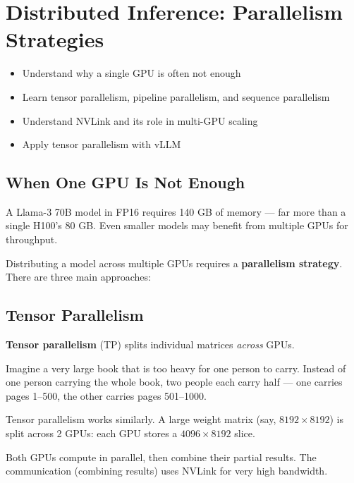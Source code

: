 \documentclass[10pt, oneside, openany]{book}
\newcommand{\analogybox}[2]{\begin{tcolorbox}[analogystyle, title={Analogy: #1}]#2\end{tcolorbox}}
\newenvironment{learningobjectives}
  {\begin{tcolorbox}[enhanced, breakable,
    colback={rgb,255:red,232;green,240;blue,255},
    colframe=NavyBlue, boxrule=1.5pt, arc=4pt,
    title={\bfseries Learning Objectives},
    fonttitle=\bfseries\color{white},
    attach boxed title to top left={yshift=-2mm, xshift=5mm},
    boxed title style={colback=NavyBlue, arc=2pt}]
  \begin{itemize}[leftmargin=1.5em, itemsep=2pt]}
  {\end{itemize}\end{tcolorbox}}
\newcommand{\keyterm}[1]{\textbf{\color{AccentOrange}#1}}
\begin{document}
\chapter{Distributed Inference: Parallelism Strategies}
\label{ch:distributed}

\begin{learningobjectives}
  \item Understand why a single GPU is often not enough
  \item Learn tensor parallelism, pipeline parallelism, and sequence parallelism
  \item Understand NVLink and its role in multi-GPU scaling
  \item Apply tensor parallelism with vLLM
\end{learningobjectives}

\section{When One GPU Is Not Enough}

A Llama-3 70B model in FP16 requires 140 GB of memory --- far more than a single
H100's 80 GB.  Even smaller models may benefit from multiple GPUs for throughput.

Distributing a model across multiple GPUs requires a \textbf{parallelism strategy}.
There are three main approaches:

\section{Tensor Parallelism}

\keyterm{Tensor parallelism} (TP) splits individual matrices \textit{across} GPUs.

\analogybox{The Heavy Book}{
Imagine a very large book that is too heavy for one person to carry.
Instead of one person carrying the whole book, two people each carry half ---
one carries pages 1--500, the other carries pages 501--1000.

Tensor parallelism works similarly.  A large weight matrix (say, $8192 \times 8192$)
is split across 2 GPUs: each GPU stores a $4096 \times 8192$ slice.

Both GPUs compute in parallel, then combine their partial results.  The
communication (combining results) uses NVLink for very high bandwidth.
}
\end{document}
